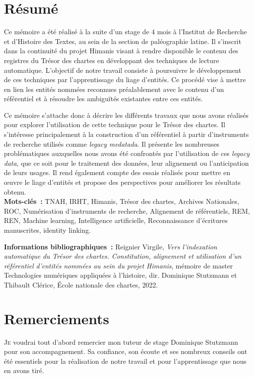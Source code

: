 \documentclass[a4paper,12pt,twoside]{book}
\begin{document}
	\chapter{Résumé}
	\medskip
	Ce mémoire a été réalisé à la suite d'un stage de 4 mois à l'Institut de Recherche et d'Histoire des Textes, au sein de la section de paléographie latine. Il s'inscrit dans la continuité du projet Himanis visant à rendre disponible le contenu des registres du Trésor des chartes en développant des techniques de lecture automatique. L'objectif de notre travail consiste à poursuivre le développement de ces techniques par l'apprentissage du liage d'entités. Ce procédé vise à mettre en lien les entités nommées reconnues préalablement avec le contenu d'un référentiel et à résoudre les ambiguïtés existantes entre ces entités.
	
	Ce mémoire s'attache donc à décrire les différents travaux que nous avons réalisés pour explorer l'utilisation de cette technique pour le Trésor des chartes. Il s'intéresse principalement à la construction d'un référentiel à partir d'instruments de recherche utilisés comme \textit{legacy medatada}. Il présente les nombreuses problématiques auxquelles nous avons été confrontés par l'utilisation de ces \textit{legacy data}, que ce soit pour le traitement des données, leur alignement ou l'anticipation de leurs usages. Il rend également compte des essais réalisés pour mettre en œuvre le liage d'entités et propose des perspectives pour améliorer les résultats obtenu.\\
	
	\textbf{Mots-clés~:} TNAH, IRHT, Himanis, Trésor des chartes, Archives Nationales, ROC, Numérisation d'instruments de recherche, Alignement de référentiels, REM, REN, Machine learning, Intelligence artificielle, Reconnaissance d'écritures manuscrites, identity linking.
	
	\textbf{Informations bibliographiques~:} Reignier Virgile, \textit{Vers l’indexation automatique du Trésor des chartes. Constitution, alignement et utilisation d'un référentiel d’entités nommées au sein du projet Himanis}, mémoire de master \og{}Technologies numériques appliquées à l'histoire\fg{}, dir. Dominique Stutzmann et Thibault Clérice, École nationale des chartes, 2022.
	
	\chapter{Remerciements}
	
	\lettrine{J}e voudrai tout d'abord remercier mon tuteur de stage Dominique Stutzmann pour son accompagnement. Sa confiance, son écoute et ses nombreux conseils ont été essentiels pour la réalisation de notre travail et pour l'apprentissage que nous en avons tiré.
	
\end{document}
